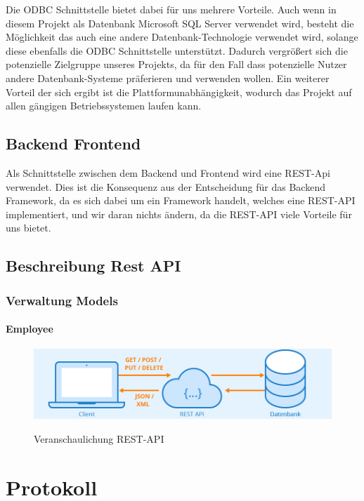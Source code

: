 \documentclass{article}
\begin{document}
Die ODBC Schnittstelle bietet dabei für uns mehrere Vorteile. Auch wenn in
diesem Projekt als Datenbank Microsoft SQL Server verwendet wird, besteht die
Möglichkeit das auch eine andere Datenbank-Technologie verwendet wird, solange
diese ebenfalls die ODBC Schnittstelle unterstützt. Dadurch vergrößert sich die
potenzielle Zielgruppe unseres Projekts, da für den Fall dass potenzielle
Nutzer andere Datenbank-Systeme präferieren und verwenden wollen. Ein weiterer
Vorteil der sich ergibt ist die Plattformunabhängigkeit, wodurch das Projekt
auf allen gängigen Betriebssystemen laufen kann.

\subsection{Backend Frontend}
Als Schnittstelle zwischen dem Backend und Frontend wird eine REST-Api
verwendet. Dies ist die Konsequenz aus der Entscheidung für das Backend
Framework, da es sich dabei um ein Framework handelt, welches eine REST-API
implementiert, und wir daran nichts ändern, da die REST-API viele Vorteile für
uns bietet.


\subsection{Beschreibung Rest API}

\subsubsection{Verwaltung Models}

\paragraph{Employee}


\begin{figure}[h]
    \centering
    \includegraphics[width= \textwidth]{images/Rest-API.png}
    \caption{Veranschaulichung REST-API}
    \label{fig:beispiel}
    \cite{REST}
\end{figure}

\newpage

\section{Protokoll}
\end{document}
